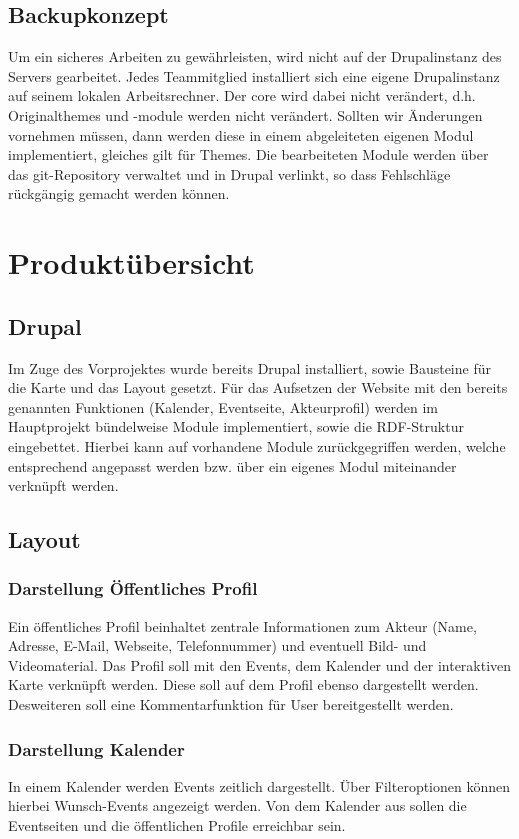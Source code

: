 \documentclass{swp}
\begin{document}
\subsection{Backupkonzept}
Um ein sicheres Arbeiten zu gew\"ahrleisten, wird nicht auf der Drupalinstanz des Servers gearbeitet. Jedes Teammitglied installiert sich eine eigene Drupalinstanz auf seinem lokalen Arbeitsrechner. Der \glqq core\grqq{} wird dabei nicht ver\"andert, d.h. Originalthemes und -module werden nicht ver\"andert. Sollten wir \"Anderungen vornehmen m\"ussen, dann werden diese in einem abgeleiteten eigenen Modul implementiert, gleiches gilt f\"ur Themes. Die bearbeiteten Module werden \"uber das git-Repository verwaltet und in Drupal verlinkt, so dass Fehlschl\"age r\"uckg\"angig gemacht werden k\"onnen.
\section{Produkt\"ubersicht}
\subsection{Drupal}
Im Zuge des Vorprojektes wurde bereits Drupal installiert, sowie Bausteine f\"ur die Karte und das Layout gesetzt. F\"ur das Aufsetzen der Website mit den bereits genannten Funktionen (Kalender, Eventseite, Akteurprofil) werden im Hauptprojekt b\"undelweise Module implementiert, sowie die RDF-Struktur eingebettet. Hierbei kann auf vorhandene Module zur\"uckgegriffen werden, welche entsprechend angepasst werden bzw. \"uber ein eigenes Modul miteinander verkn\"upft werden. 
\subsection{Layout}
\subsubsection{Darstellung \"Offentliches Profil}
Ein \"offentliches Profil beinhaltet zentrale Informationen zum Akteur (Name, Adresse, E-Mail, Webseite, Telefonnummer) und eventuell Bild- und Videomaterial. Das Profil soll mit den Events, dem Kalender und der interaktiven Karte verkn\"upft werden. Diese soll auf dem Profil ebenso dargestellt werden. Desweiteren soll eine Kommentarfunktion f\"ur User bereitgestellt werden. 
\subsubsection{Darstellung Kalender}
In einem Kalender werden Events zeitlich dargestellt. \"Uber Filteroptionen k\"onnen hierbei \glqq Wunsch-Events\grqq{} angezeigt werden. Von dem Kalender aus sollen die Eventseiten und die \"offentlichen Profile erreichbar sein.
\end{document}
